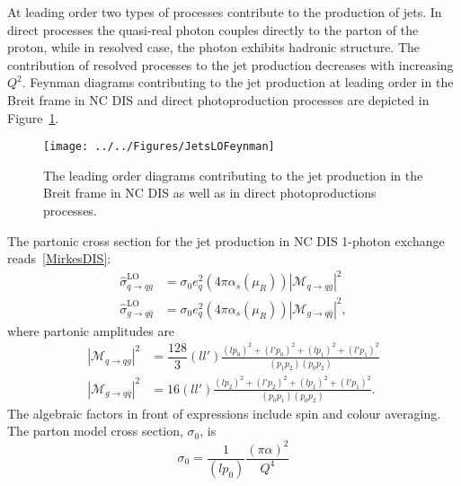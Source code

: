 At leading order two types of processes contribute to the production of jets. In direct processes the quasi-real photon couples directly to the parton of the proton, while in resolved case, the photon exhibits hadronic structure. The contribution of resolved processes to the jet production decreases with increasing $Q^2$. Feynman diagrams contributing to the jet production at leading order in the Breit frame in NC DIS and direct photoproduction processes are depicted in Figure~\ref{fig:borndirectfeyn}.

\begin{figure}[h]
 \centering
 \texttt{[image: ../../Figures/JetsLOFeynman]}
 \caption{The leading order diagrams contributing to the jet production in the Breit frame in NC DIS as well as in direct photoproductions processes.}
 \label{fig:borndirectfeyn}
\end{figure}

The partonic cross section for the jet production in NC DIS 1-photon exchange reads~\ref{MirkesDIS}:
\begin{align}{}
 \hat{\sigma}^\mathrm{LO}_{q \rightarrow qg} &= \sigma_0 e_q^2 \left( 4\pi \alpha_s\left(\mu_R\right) \right) \left|\mathcal{M}_{q \rightarrow qg} \right|^2 \\
 \hat{\sigma}^\mathrm{LO}_{g \rightarrow q\bar{q}} &= \sigma_0 e_q^2 \left( 4\pi \alpha_s\left(\mu_R\right) \right) \left|\mathcal{M}_{g \rightarrow q\bar{q} } \right|^2,
\end{align}
where partonic amplitudes are
\begin{align}
 \left|\mathcal{M}_{q \rightarrow qg} \right|^2 &= \dfrac{128}{3} \left(ll'\right) \frac{\left(lp_0\right)^2 + \left(l'p_0\right)^2 + \left(lp_1\right)^2 + \left(l'p_1\right)^2 }{\left(p_1p_2\right)\left(p_0p_2\right)}\\
 \left|\mathcal{M}_{g \rightarrow q\bar{q} } \right|^2 &= 16 \left(ll'\right) \frac{\left(lp_2\right)^2 + \left(l'p_2\right)^2 + \left(lp_1\right)^2 + \left(l'p_1\right)^2 }{\left(p_0p_1\right)\left(p_0p_2\right)}.
\end{align}
The algebraic factors in front of expressions include spin and colour averaging. The parton model cross section, $\sigma_0$, is
\begin{equation}
 \sigma_0 = \dfrac{1}{\left(lp_0\right)}\frac{\left(\pi\alpha\right)^2}{Q^4}
\end{equation}


